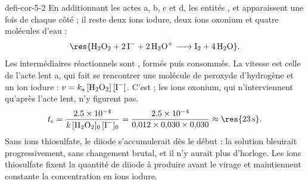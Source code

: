 \begin{blocEdition}{defi-cor-5-2}
En additionnant les actes a, b, c et d, les entités ,  et  apparaissent une fois de chaque
côté ; il reste deux ions iodure, deux ions oxonium et quatre molécules d'eau :
\[\res{\ce{H2O2 + 2 I- + 2 H3O+ -> I2 + 4 H2O}}.\] Les intermédiaires réactionnels sont
, formés puis consommés. La vitesse est celle de l'acte lent a, qui fait se
rencontrer une molécule de peroxyde d'hydrogène et un ion iodure : $v=k_\mathrm{a}\,[\ce{H2O2}]\,[\ce{I-}]$. C'est
 ; les ions oxonium, qui n'interviennent qu'après l'acte lent, n'y figurent pas.
\[t_\mathrm{c}=\frac{\num{2.5e-4}}{k\,[\ce{H2O2}]_0\,[\ce{I-}]_0}=\frac{\num{2.5e-4}}{0{,}012\times0{,}030\times0{,}030}\approx\res{\qty{23}{s}}.\]
Sans ions thiosulfate, le diiode s'accumulerait dès le début : la solution bleuirait progressivement, sans
changement brutal, et il n'y aurait plus d'horloge. Les ions thiosulfate fixent la quantité de diiode à produire
avant le virage et maintiennent constante la concentration en ions iodure.
\end{blocEdition}

